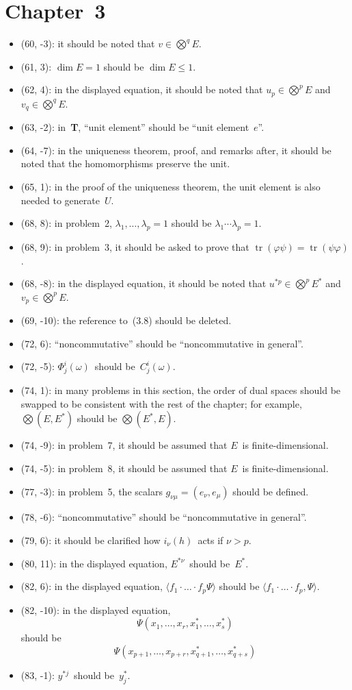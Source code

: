 \documentclass[letterpaper,12pt]{article}
\DeclareMathOperator{\tr}{tr}
\newcommand{\bigtprod}{\bigotimes}
\newcommand{\sprod}[2]{\langle#1,#2\rangle}
\newcommand{\iprod}[2]{(#1,#2)}
\begin{document}
\section*{Chapter~3}
\begin{itemize}
\item (60, -3): it should be noted that \(v\in\bigtprod^q E\).
\item (61, 3): \(\dim E=1\) should be \(\dim E\le 1\).
\item (62, 4): in the displayed equation, it should be noted that \(u_p\in\bigtprod^p E\) and \(v_q\in\bigtprod^q E\).
\item (63, -2): in~\textbf{T}, ``unit element'' should be ``unit element~\(e\)''.
\item (64, -7): in the uniqueness theorem, proof, and remarks after, it should be noted that the homomorphisms preserve the unit.
\item (65, 1): in the proof of the uniqueness theorem, the unit element is also needed to generate~\(U\).
\item (68, 8): in problem~2, \(\lambda_1,\ldots,\lambda_p=1\) should be \(\lambda_1\cdots\lambda_p=1\).
\item (68, 9): in problem~3, it should be asked to prove that \(\tr(\varphi\psi)=\tr(\psi\varphi)\).
\item (68, -8): in the displayed equation, it should be noted that \(u^{*p}\in\bigtprod^p E^*\) and \(v_p\in\bigtprod^p E\).
\item (69, -10): the reference to~(3.8) should be deleted.
\item (72, 6): ``noncommutative'' should be ``noncommutative in general''.
\item (72, -5): \(\Phi^i_j(\omega)\)~should be~\(C^i_j(\omega)\).
\item (74, 1): in many problems in this section, the order of dual spaces should be swapped to be consistent with the rest of the chapter; for example, \(\bigtprod(E,E^*)\) should be \(\bigtprod(E^*,E)\).
\item (74, -9): in problem~7, it should be assumed that \(E\)~is finite-dimensional.
\item (74, -5): in problem~8, it should be assumed that \(E\)~is finite-dimensional.
\item (77, -3): in problem~5, the scalars \(g_{\nu\mu}=\iprod{e_{\nu}}{e_{\mu}}\) should be defined.
\item (78, -6): ``noncommutative'' should be ``noncommutative in general''.
\item (79, 6): it should be clarified how \(i_{\nu}(h)\)~acts if \(\nu>p\).
\item (80, 11): in the displayed equation, \(E^{*\nu}\)~should be~\(E^*\).
\item (82, 6): in the displayed equation, \(\langle f_1\cdot\ldots\cdot f_p\Psi\rangle\) should be \(\sprod{f_1\cdot\ldots\cdot f_p}{\Psi}\).
\item (82, -10): in the displayed equation,
\[\Psi(x_1,\ldots,x_r,x^*_1,\ldots,x^*_s)\]
should be
\[\Psi(x_{p+1},\ldots,x_{p+r},x^*_{q+1},\ldots,x^*_{q+s})\]
\item (83, -1): \(y^{*j}\)~should be~\(y^*_j\).
\end{itemize}
\end{document}
